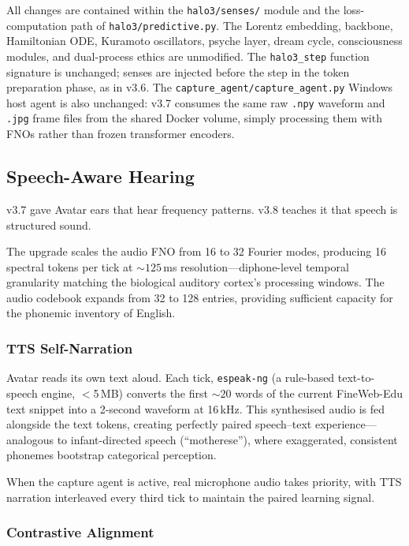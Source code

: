 All changes are contained within the \texttt{halo3/senses/} module and the
loss-computation path of \texttt{halo3/predictive.py}.
The Lorentz embedding, backbone, Hamiltonian ODE, Kuramoto oscillators, psyche layer,
dream cycle, consciousness modules, and dual-process ethics are unmodified.
The \texttt{halo3\_step} function signature is unchanged; senses are injected before
the step in the token preparation phase, as in v3.6.
The \texttt{capture\_agent/capture\_agent.py} Windows host agent is also unchanged:
v3.7 consumes the same raw \texttt{.npy} waveform and \texttt{.jpg} frame files from
the shared Docker volume, simply processing them with FNOs rather than frozen
transformer encoders.

\subsection{Speech-Aware Hearing}
\label{sec:speech_aware}

v3.7 gave Avatar ears that hear frequency patterns. v3.8 teaches it that speech is structured sound.

The upgrade scales the audio FNO from 16 to 32 Fourier modes, producing 16 spectral tokens per tick at ${\sim}125$\,ms resolution---diphone-level temporal granularity matching the biological auditory cortex's processing windows. The audio codebook expands from 32 to 128 entries, providing sufficient capacity for the phonemic inventory of English.

\subsubsection{TTS Self-Narration}

Avatar reads its own text aloud. Each tick, \texttt{espeak-ng} (a rule-based text-to-speech engine, $<$5\,MB) converts the first ${\sim}20$ words of the current FineWeb-Edu text snippet into a 2-second waveform at 16\,kHz. This synthesised audio is fed alongside the text tokens, creating perfectly paired speech--text experience---analogous to infant-directed speech (``motherese''), where exaggerated, consistent phonemes bootstrap categorical perception.

When the capture agent is active, real microphone audio takes priority, with TTS narration interleaved every third tick to maintain the paired learning signal.

\subsubsection{Contrastive Alignment}

